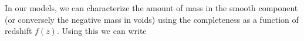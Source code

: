In our models, we can characterize the amount of mass in the smooth component (or conversely the negative mass in voids)
using the completeness as a function of redshift $f(z)$. Using this we can write